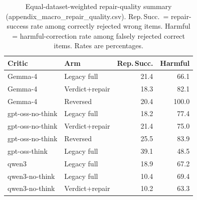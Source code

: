 \documentclass[journal]{IEEEtran}
\begin{document}
\begin{table}[h]
\centering
\footnotesize
\setlength{\tabcolsep}{3pt}
\begin{tabular}{llrr}
\toprule
Critic & Arm & Rep.\,Succ. & Harmful \\
\midrule
Gemma-4 & Legacy full & 21.4 & 66.1 \\
Gemma-4 & Verdict+repair & 18.3 & 82.1 \\
Gemma-4 & Reversed & 20.4 & 100.0 \\
gpt-oss-no-think & Legacy full & 18.2 & 77.4 \\
gpt-oss-no-think & Verdict+repair & 21.4 & 75.0 \\
gpt-oss-no-think & Reversed & 25.5 & 83.9 \\
gpt-oss-think & Legacy full & 39.1 & 48.5 \\
qwen3 & Legacy full & 18.9 & 67.2 \\
qwen3-no-think & Legacy full & 10.4 & 69.4 \\
qwen3-no-think & Verdict+repair & 10.2 & 63.3 \\
\bottomrule
\end{tabular}
\caption{Equal-dataset-weighted repair-quality summary (appendix\_macro\_repair\_quality.csv). Rep.\,Succ.\ = repair-success rate among correctly rejected wrong items. Harmful = harmful-correction rate among falsely rejected correct items. Rates are percentages.}
\label{tab:macro-repair-quality}
\end{table}
\end{document}
